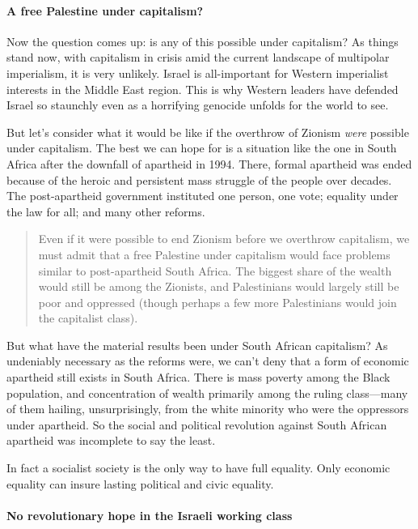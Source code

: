 \paragraph{A free Palestine under capitalism?}

Now the question comes up: is any of this possible under capitalism? As things stand now, with capitalism in crisis amid the current landscape of multipolar imperialism, it is very unlikely. Israel is all-important for Western imperialist interests in the Middle East region. This is why Western leaders have defended Israel so staunchly even as a horrifying genocide unfolds for the world to see.

But let's consider what it would be like if the overthrow of Zionism \emph{were} possible under capitalism. The best we can hope for is a situation like the one in South Africa after the downfall of apartheid in 1994. There, formal apartheid was ended because of the heroic and persistent mass struggle of the people over decades. The post-apartheid government instituted one person, one vote; equality under the law for all; and many other reforms.

\blockquote{Even if it were possible to end Zionism before we overthrow capitalism, we must admit that a free Palestine under capitalism would face problems similar to post-apartheid South Africa. The biggest share of the wealth would still be among the Zionists, and Palestinians would largely still be poor and oppressed (though perhaps a few more Palestinians would join the capitalist class).}

But what have the material results been under South African capitalism? As undeniably necessary as the reforms were, we can't deny that a form of economic apartheid still exists in South Africa. There is mass poverty among the Black population, and concentration of wealth primarily among the ruling class---many of them hailing, unsurprisingly, from the white minority who were the oppressors under apartheid. So the social and political revolution against South African apartheid was incomplete to say the least.

In fact a socialist society is the only way to have full equality. Only economic equality can insure lasting political and civic equality.

\paragraph{No revolutionary hope in the Israeli working class}

